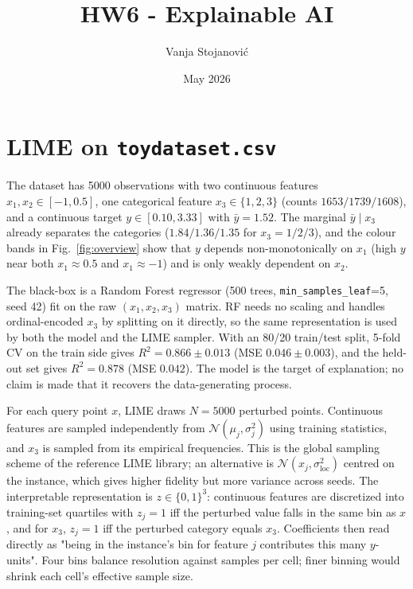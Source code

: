 \documentclass[10pt, a4paper]{article}
\title{\textbf{HW6 - Explainable AI}}
\author{Vanja Stojanovi\'c}
\date{May 2026}
\begin{document}
\maketitle

\section{LIME on \texttt{toydataset.csv}}

The dataset has 5000 observations with two continuous features $x_1, x_2 \in [-1, 0.5]$, one categorical feature $x_3 \in \{1, 2, 3\}$ (counts $1653 / 1739 / 1608$), and a continuous target $y \in [0.10, 3.33]$ with $\bar y = 1.52$. The marginal $\bar y \mid x_3$ already separates the categories ($1.84 / 1.36 / 1.35$ for $x_3 = 1 / 2 / 3$), and the colour bands in Fig.~\ref{fig:overview} show that $y$ depends non-monotonically on $x_1$ (high $y$ near both $x_1 \approx 0.5$ and $x_1 \approx -1$) and is only weakly dependent on $x_2$.

The black-box is a Random Forest regressor (500 trees, \texttt{min\_samples\_leaf}=5, seed 42) fit on the raw $(x_1, x_2, x_3)$ matrix. RF needs no scaling and handles ordinal-encoded $x_3$ by splitting on it directly, so the same representation is used by both the model and the LIME sampler. With an 80/20 train/test split, 5-fold CV on the train side gives $R^2 = 0.866 \pm 0.013$ (MSE $0.046 \pm 0.003$), and the held-out set gives $R^2 = 0.878$ (MSE $0.042$). The model is the target of explanation; no claim is made that it recovers the data-generating process.

For each query point $x$, LIME draws $N = 5000$ perturbed points. Continuous features are sampled independently from $\mathcal N(\mu_j, \sigma_j^2)$ using training statistics, and $x_3$ is sampled from its empirical frequencies. This is the global sampling scheme of the reference LIME library; an alternative is $\mathcal N(x_j, \sigma_{\text{loc}}^2)$ centred on the instance, which gives higher fidelity but more variance across seeds. The interpretable representation is $z \in \{0,1\}^3$: continuous features are discretized into training-set quartiles with $z_j = 1$ iff the perturbed value falls in the same bin as $x$, and for $x_3$, $z_j = 1$ iff the perturbed category equals $x_3$. Coefficients then read directly as "being in the instance's bin for feature $j$ contributes this many $y$-units". Four bins balance resolution against samples per cell; finer binning would shrink each cell's effective sample size.
\end{document}
